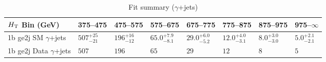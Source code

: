 \documentclass[8pt]{article}
\def\scalht{\mbox{$H_{\rm{T}}$}\xspace}
\newcommand\T{\rule{0pt}{2.6ex}}
\begin{document}
\begin{table}[ht!]
\caption{Fit summary ($\gamma$+jets)}
\label{tab:ensemble-summary}
\centering
\begin{tabular}{ llllllll }

\hline
\scalht Bin (GeV)       & 375--475                       & 475--575                       & 575--675                       & 675--775                       & 775--875                       & 875--975                       & 975--$\infty$                  \\ [1.000000ex]
\hline
1b ge2j SM $\gamma$+jets\T & $507^{+25}_{-21}$              & $196^{+16}_{-12}$              & $65.0^{+7.9}_{-8.1}$           & $29.0^{+6.0}_{-5.2}$           & $12.0^{+4.0}_{-3.1}$           & $8.0^{+3.0}_{-3.0}$            & $5.0^{+2.1}_{-2.1}$            \\ 
1b ge2j Data $\gamma$+jets\T & $507$                          & $196$                          & $65$                           & $29$                           & $12$                           & $8$                            & $5$                            \\ 
\hline

\end{tabular}
\end{table}
\end{document}
